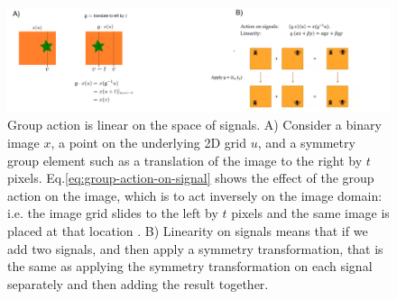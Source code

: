 \documentclass[11pt]{article}
\numberwithin{equation}{section}
\begin{document}
\begin{figure}
\begin{center}
\includegraphics[width=\columnwidth]{../figures/group-action-linearity.png}  
\end{center}
\caption{Group action is linear on the space of signals. A) Consider a binary image $x$, a point on the underlying 2D grid $u$, and a symmetry group element such as a translation of the image to the right by $t$ pixels. Eq.\eqref{eq:group-action-on-signal} shows the effect of the group action on the image, which is to act inversely on the image domain: i.e. the image grid slides to the left by $t$ pixels and the same image is placed at that location . B) Linearity on signals means that if we add two signals, and then apply a symmetry transformation, that is the same as applying the symmetry transformation on each signal separately and then adding the result together. 
}
\label{fig:linearity-group-action}
\end{figure}

\newpage
 
\end{document}
